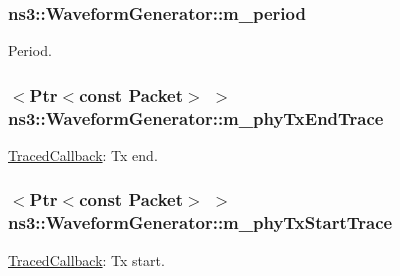 \subsubsection[{\texorpdfstring{m\+\_\+period}{m_period}}]{ ns3\+::\+Waveform\+Generator\+::m\+\_\+period\hspace{0.3cm}{\ttfamily [private]}}\hypertarget{classns3_1_1WaveformGenerator_ae6c7e737791fc378b8efae9b2fae48e3}{}\label{classns3_1_1WaveformGenerator_ae6c7e737791fc378b8efae9b2fae48e3}


Period. 

\subsubsection[{\texorpdfstring{m\+\_\+phy\+Tx\+End\+Trace}{m_phyTxEndTrace}}]{$<${\bf Ptr}$<$const {\bf Packet}$>$ $>$ ns3\+::\+Waveform\+Generator\+::m\+\_\+phy\+Tx\+End\+Trace\hspace{0.3cm}{\ttfamily [private]}}\hypertarget{classns3_1_1WaveformGenerator_af6111fb8eea2a3e2be3a96a5f28cb129}{}\label{classns3_1_1WaveformGenerator_af6111fb8eea2a3e2be3a96a5f28cb129}


\hyperlink{classns3_1_1TracedCallback}{Traced\+Callback}\+: Tx end. 

\subsubsection[{\texorpdfstring{m\+\_\+phy\+Tx\+Start\+Trace}{m_phyTxStartTrace}}]{$<${\bf Ptr}$<$const {\bf Packet}$>$ $>$ ns3\+::\+Waveform\+Generator\+::m\+\_\+phy\+Tx\+Start\+Trace\hspace{0.3cm}{\ttfamily [private]}}\hypertarget{classns3_1_1WaveformGenerator_a2a0659bb685dc46fa9cd7c6b85cf6a42}{}\label{classns3_1_1WaveformGenerator_a2a0659bb685dc46fa9cd7c6b85cf6a42}


\hyperlink{classns3_1_1TracedCallback}{Traced\+Callback}\+: Tx start. 

